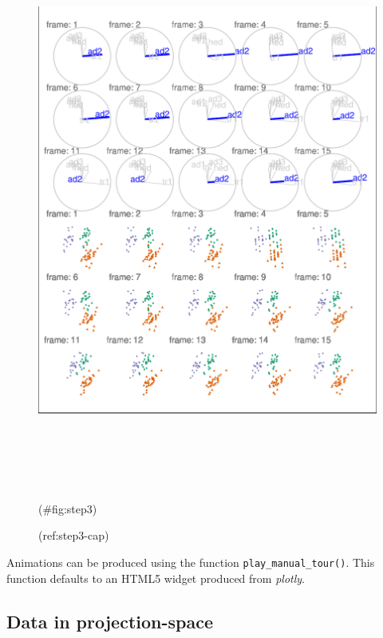 \begin{Schunk}
\begin{figure}

{\centering \includegraphics[width=6in,height=7.2in]{spinifex_paper_files/figure-latex/step3-1} 

}

\caption[(ref:step3-cap)]{(ref:step3-cap)}(\#fig:step3)
\end{figure}
\end{Schunk}

Animations can be produced using the function \texttt{play\_manual\_tour()}. This function defaults to an HTML5 widget produced from \emph{plotly}.

\hypertarget{sec:display}{%
\subsection{Data in projection-space}\label{sec:display}}

